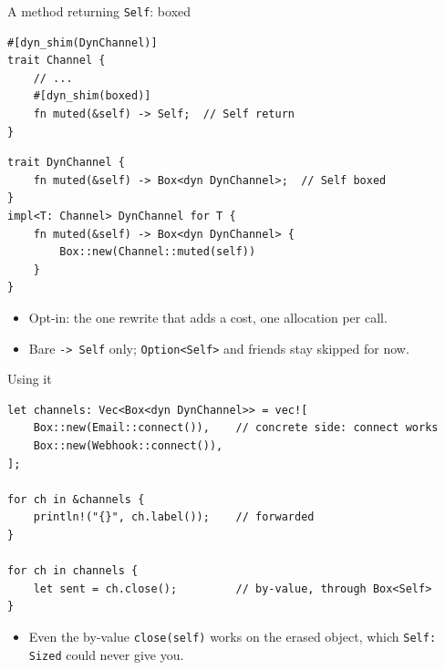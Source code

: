 \documentclass[aspectratio=169]{beamer}
\begin{document}
\begin{frame}[fragile]{A method returning \texttt{Self}: boxed}
\begin{lstlisting}
#[dyn_shim(DynChannel)]
trait Channel {
    // ...
    #[dyn_shim(boxed)]
    fn muted(&self) -> Self;  // Self return
}
\end{lstlisting}
\pause
\begin{lstlisting}
trait DynChannel {
    fn muted(&self) -> Box<dyn DynChannel>;  // Self boxed
}
impl<T: Channel> DynChannel for T {
    fn muted(&self) -> Box<dyn DynChannel> {
        Box::new(Channel::muted(self))
    }
}
\end{lstlisting}
  \begin{itemize}
    \item Opt-in: the one rewrite that adds a cost, one allocation per call.
    \item Bare \texttt{-> Self} only; \texttt{Option<Self>} and friends stay
          skipped for now.
  \end{itemize}
\end{frame}

\begin{frame}[fragile]{Using it}
\begin{lstlisting}
let channels: Vec<Box<dyn DynChannel>> = vec![
    Box::new(Email::connect()),    // concrete side: connect works
    Box::new(Webhook::connect()),
];

for ch in &channels {
    println!("{}", ch.label());    // forwarded
}

for ch in channels {
    let sent = ch.close();         // by-value, through Box<Self>
}
\end{lstlisting}
  \begin{itemize}
    \item Even the by-value \texttt{close(self)} works on the erased object,
          which \texttt{Self: Sized} could never give you.
  \end{itemize}
\end{frame}

\end{document}
